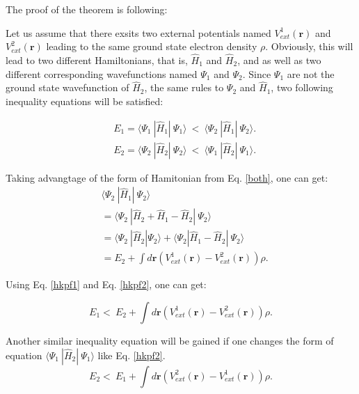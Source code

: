 \documentclass[a4paper, 12pt, titlepage,oneside,drop]{kthesis}
\begin{document}
The proof of the theorem is following:

Let us assume that there exsits two external potentials named $V^{1}_\textit{ext}(\textbf{r})$ and $V^{2}_\textit{ext}(\textbf{r})$ leading to the same ground state 
electron density $\rho$. Obviously, this will lead to two different Hamiltonians, that is, $\hat{H}_{1}$ and $\hat{H}_{2}$, and as well as two different corresponding
wavefunctions named $\Psi_1$ and $\Psi_2$. Since $\Psi_1$ are not the ground state wavefunction of $\hat{H}_{2}$, the same rules to $\Psi_2$ and $\hat{H}_{1}$, two following
inequality equations will be satisfied:

\begin{equation}\label{hkpf1}\begin{split}
&  E_1 = \langle \Psi_1\ |\hat{H}_{1}|\ \Psi_1 \rangle  \ < \  \langle \Psi_2\ |\hat{H}_{1}|\ \Psi_2 \rangle.\\
&  E_2 = \langle \Psi_2\ |\hat{H}_{2}|\ \Psi_2 \rangle  \ < \  \langle \Psi_1\ |\hat{H}_{2}|\ \Psi_1 \rangle.
\end{split}\end{equation}

Taking advangtage of the form of Hamitonian from Eq. \ref{both}, one can get:
\begin{equation}\label{hkpf2}\begin{split}
&    \langle \Psi_2\ |\hat{H}_{1}|\ \Psi_2 \rangle \\
&  = \langle \Psi_2\ |\hat{H}_{2} + \hat{H}_{1} - \hat{H}_{2}|\ \Psi_2 \rangle \\
&  = \langle \Psi_2\ |\hat{H}_{2} |\Psi_2 \rangle + \langle \Psi_2 | \hat{H}_{1} - \hat{H}_{2}|\ \Psi_2 \rangle \\
&  = E_2 + \int d \textbf{r} ( V^{1}_\textit{ext}(\textbf{r}) - V^{2}_\textit{ext}(\textbf{r}) )  \rho.
\end{split}\end{equation}

Using Eq. \ref{hkpf1} and Eq. \ref{hkpf2}, one can get:

\begin{equation}\label{hkpf3}
 E_1  < \  E_2 + \int d \textbf{r} ( V^{1}_\textit{ext}(\textbf{r}) - V^{2}_\textit{ext}(\textbf{r}) )  \rho.
\end{equation}

Another similar inequality equation will be gained if one changes the form of equation $\langle \Psi_1\ |\hat{H}_{2}|\ \Psi_1 \rangle$ like Eq. \ref{hkpf2}.
\begin{equation}\label{hkpf4}
  E_2  < \  E_1 + \int d \textbf{r} ( V^{2}_\textit{ext}(\textbf{r}) - V^{1}_\textit{ext}(\textbf{r}) )  \rho.
\end{equation}
\end{document}
